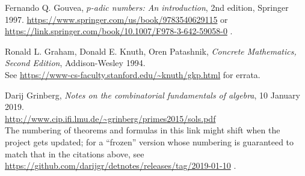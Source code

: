 \documentclass[paper=a4, fontsize=12pt]{scrartcl} %
\theoremstyle{plainsl}
\theoremstyle{definition}
\theoremstyle{remark}
\begin{document}
\begin{thebibliography}{99999999}                                                                                         %


Fernando Q. Gouvea,
\textit{$p$-adic numbers: An introduction},
2nd edition, Springer 1997.
\url{https://www.springer.com/us/book/9783540629115} or
\url{https://link.springer.com/book/10.1007/F978-3-642-59058-0} .

Ronald L. Graham, Donald E. Knuth, Oren Patashnik,
\textit{Concrete Mathematics, Second Edition}, Addison-Wesley 1994.\\
See \url{https://www-cs-faculty.stanford.edu/~knuth/gkp.html} for errata.

Darij Grinberg,
\textit{Notes on the combinatorial fundamentals of algebra},
10 January 2019. \\
\url{http://www.cip.ifi.lmu.de/~grinberg/primes2015/sols.pdf}
\\
The numbering of theorems and formulas in this link might shift
when the project gets updated; for a ``frozen'' version whose
numbering is guaranteed to match that in the citations above, see
\url{https://github.com/darijgr/detnotes/releases/tag/2019-01-10} .

\end{thebibliography}
\end{document}

